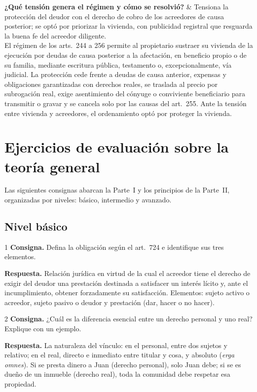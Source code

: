 \documentclass[12pt,oneside]{book}
\newcommand{\cq}[2]{\textbf{#1} & #2 \\[0.45em]}
\begin{document}
{\cq{¿Qué tensión genera el régimen y cómo se resolvió?}{Tensiona la protección del deudor con el derecho de cobro de los acreedores de causa posterior; se optó por priorizar la vivienda, con publicidad registral que resguarda la buena fe del acreedor diligente.}
}{El régimen de los arts.~244 a 256 permite al propietario sustraer su vivienda de la ejecución por deudas de causa posterior a la afectación, en beneficio propio o de su familia, mediante escritura pública, testamento o, excepcionalmente, vía judicial. La protección cede frente a deudas de causa anterior, expensas y obligaciones garantizadas con derechos reales, se traslada al precio por subrogación real, exige asentimiento del cónyuge o conviviente beneficiario para transmitir o gravar y se cancela solo por las causas del art.~255. Ante la tensión entre vivienda y acreedores, el ordenamiento optó por proteger la vivienda.}


\appendix
\chapter{Ejercicios de evaluación sobre la teoría general}\label{ap:ejercicios}

Las siguientes consignas abarcan la Parte~I y los principios de la Parte~II, organizadas por niveles: básico, intermedio y avanzado.

\section{Nivel básico}

\begin{ejercicio}{1}
\textbf{Consigna.} Defina la obligación según el art.~724 e identifique sus tres elementos.

\textbf{Respuesta.} Relación jurídica en virtud de la cual el acreedor tiene el derecho de exigir del deudor una prestación destinada a satisfacer un interés lícito y, ante el incumplimiento, obtener forzadamente su satisfacción. Elementos: sujeto activo o acreedor, sujeto pasivo o deudor y prestación (dar, hacer o no hacer).
\end{ejercicio}

\begin{ejercicio}{2}
\textbf{Consigna.} ¿Cuál es la diferencia esencial entre un derecho personal y uno real? Explique con un ejemplo.

\textbf{Respuesta.} La naturaleza del vínculo: en el personal, entre dos sujetos y relativo; en el real, directo e inmediato entre titular y cosa, y absoluto (\textit{erga omnes}). Si se presta dinero a Juan (derecho personal), solo Juan debe; si se es dueño de un inmueble (derecho real), toda la comunidad debe respetar esa propiedad.
\end{ejercicio}
\end{document}
